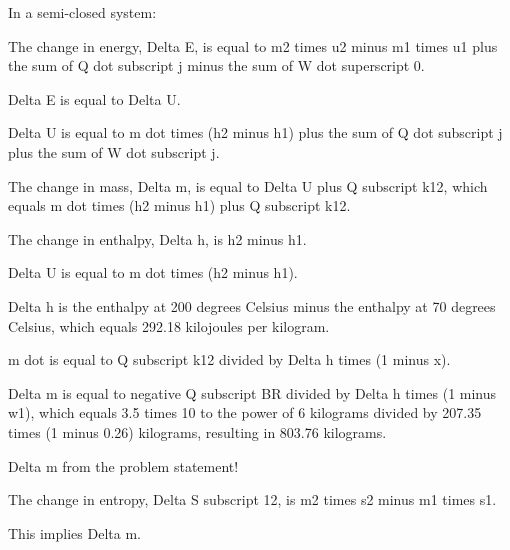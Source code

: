 In a semi-closed system:

The change in energy, Delta E, is equal to m2 times u2 minus m1 times u1 plus the sum of Q dot subscript j minus the sum of W dot superscript 0.

Delta E is equal to Delta U.

Delta U is equal to m dot times (h2 minus h1) plus the sum of Q dot subscript j plus the sum of W dot subscript j.

The change in mass, Delta m, is equal to Delta U plus Q subscript k12, which equals m dot times (h2 minus h1) plus Q subscript k12.

The change in enthalpy, Delta h, is h2 minus h1.

Delta U is equal to m dot times (h2 minus h1).

Delta h is the enthalpy at 200 degrees Celsius minus the enthalpy at 70 degrees Celsius, which equals 292.18 kilojoules per kilogram.

m dot is equal to Q subscript k12 divided by Delta h times (1 minus x).

Delta m is equal to negative Q subscript BR divided by Delta h times (1 minus w1), which equals 3.5 times 10 to the power of 6 kilograms divided by 207.35 times (1 minus 0.26) kilograms, resulting in 803.76 kilograms.

Delta m from the problem statement!

The change in entropy, Delta S subscript 12, is m2 times s2 minus m1 times s1.

This implies Delta m.